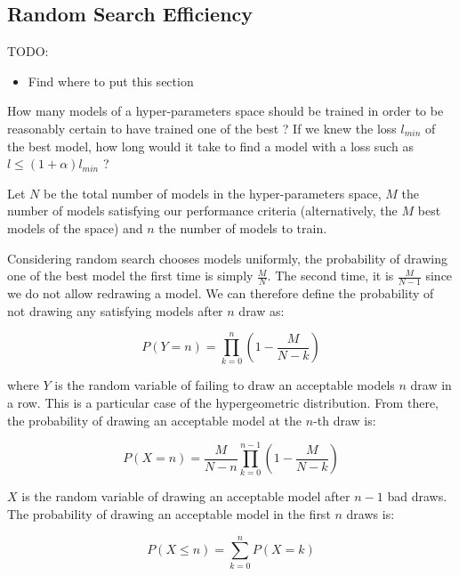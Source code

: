 \subsection{Random Search Efficiency}
\label{ssec:random}

TODO:
\begin{itemize}
    \item Find where to put this section
\end{itemize}

How many models of a hyper-parameters space should be trained in order to be reasonably certain to have trained one of the best ? If we knew the loss $l_{min}$ of the best model, how long would it take to find a model with a loss such as $l \leq (1 + \alpha) l_{min}$ ?

Let $N$ be the total number of models in the hyper-parameters space, $M$ the number of models satisfying our performance criteria (alternatively, the $M$ best models of the space) and $n$ the number of models to train.

Considering random search chooses models uniformly, the probability of drawing one of the best model the first time is simply $\frac{M}{N}$. The second time, it is $\frac{M}{N - 1}$ since we do not allow redrawing a model. We can therefore define the probability of not drawing any satisfying models after $n$ draw as:

\begin{equation}
    P \left( Y = n \right) = \prod_{k = 0}^{n} \left( 1 -  \frac{M}{N - k} \right)
\end{equation}

where $Y$ is the random variable of failing to draw an acceptable models $n$ draw in a row. This is a particular case of the hypergeometric distribution. From there, the probability of drawing an acceptable model at the $n$-th draw is:

\begin{equation}
    P\left(X = n \right) = \frac{M}{N - n} \prod_{k = 0}^{n - 1} \left( 1 -  \frac{M}{N - k} \right)
\end{equation}

$X$ is the random variable of drawing an acceptable model after $n - 1$ bad draws. The probability of drawing an acceptable model in the first $n$ draws is:

\begin{equation}
    P\left(X \leq n \right) = \sum_{k = 0}^{n} P\left(X = k \right)
\end{equation}



